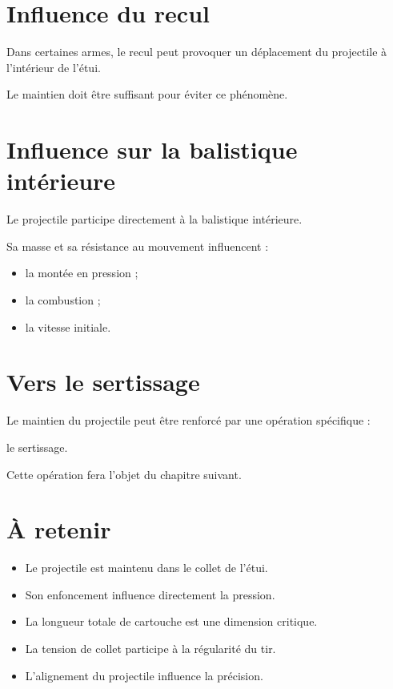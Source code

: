 \section{Influence du recul}

Dans certaines armes, le recul peut provoquer un déplacement du projectile à
l'intérieur de l'étui.

Le maintien doit être suffisant pour éviter ce phénomène.

\section{Influence sur la balistique intérieure}

Le projectile participe directement à la balistique intérieure.

Sa masse et sa résistance au mouvement influencent :

\begin{itemize}
    \item la montée en pression ;
    \item la combustion ;
    \item la vitesse initiale.
\end{itemize}

\section{Vers le sertissage}

Le maintien du projectile peut être renforcé par une opération spécifique :

le sertissage.

Cette opération fera l'objet du chapitre suivant.

\section{À retenir}

\begin{aretenir}

\begin{itemize}
    \item Le projectile est maintenu dans le collet de l'étui.
    \item Son enfoncement influence directement la pression.
    \item La longueur totale de cartouche est une dimension critique.
    \item La tension de collet participe à la régularité du tir.
    \item L'alignement du projectile influence la précision.
\end{itemize}

\end{aretenir}
